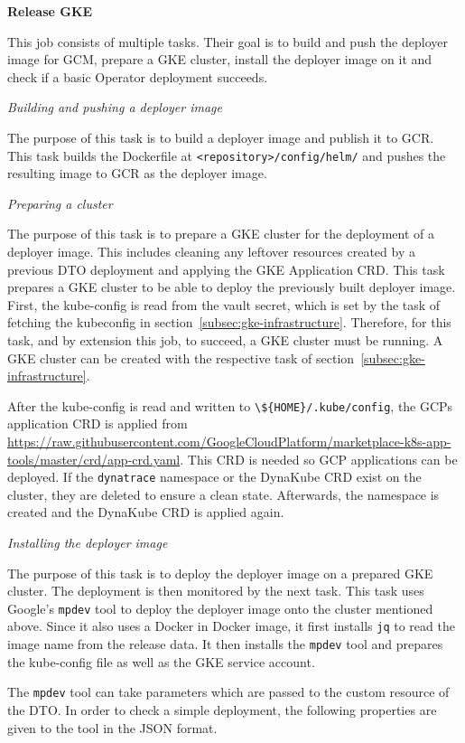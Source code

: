 \textbf{Release GKE}

This job consists of multiple tasks.
Their goal is to build and push the deployer image for GCM, prepare a GKE cluster, install the deployer image on it and check if a basic Operator deployment succeeds.

\textit{Building and pushing a deployer image}

The purpose of this task is to build a deployer image and publish it to GCR.
This task builds the Dockerfile at \verb|<repository>/config/helm/| and pushes the resulting image to GCR as the deployer image.

\pagebreak

\textit{Preparing a cluster}

The purpose of this task is to prepare a GKE cluster for the deployment of a deployer image.
This includes cleaning any leftover resources created by a previous DTO deployment and applying the GKE Application CRD.
This task prepares a GKE cluster to be able to deploy the previously built deployer image.
First, the kube-config is read from the vault secret, which is set by the task of fetching the kubeconfig in section~\ref{subsec:gke-infrastructure}.
Therefore, for this task, and by extension this job, to succeed, a GKE cluster must be running.
A GKE cluster can be created with the respective task of section~\ref{subsec:gke-infrastructure}.

After the kube-config is read and written to \verb|\${HOME}/.kube/config|, the GCPs application CRD is applied from \url{https://raw.githubusercontent.com/GoogleCloudPlatform/marketplace-k8s-app-tools/master/crd/app-crd.yaml}.
This CRD is needed so GCP applications can be deployed.
If the \verb|dynatrace| namespace or the DynaKube CRD exist on the cluster, they are deleted to ensure a clean state.
Afterwards, the namespace is created and the DynaKube CRD is applied again.

\textit{Installing the deployer image}

The purpose of this task is to deploy the deployer image on a prepared GKE cluster.
The deployment is then monitored by the next task.
This task uses Google's \verb|mpdev| tool to deploy the deployer image onto the cluster mentioned above.
Since it also uses a Docker in Docker image, it first installs \verb|jq| to read the image name from the release data.
It then installs the \verb|mpdev| tool and prepares the kube-config file as well as the GKE service account.

The \verb|mpdev| tool can take parameters which are passed to the custom resource of the DTO.
In order to check a simple deployment, the following properties are given to the tool in the JSON format.

